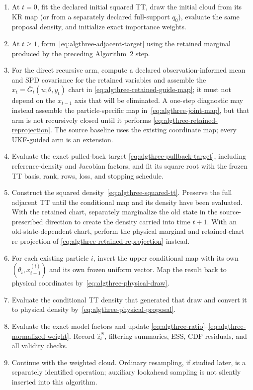 \documentclass[11pt]{article}
\begin{document}
\begin{enumerate}
\item At $t=0$, fit the declared initial squared TT, draw the initial cloud
  from its KR map (or from a separately declared full-support $q_0$), evaluate
  the same proposal density, and initialize exact importance weights.
\item At $t\geq1$, form~\eqref{eq:algthree-adjacent-target} using the retained
  marginal produced by the preceding Algorithm~2 step.
\item For the direct recursive arm, compute a declared observation-informed
  mean and SPD covariance for the retained variables and assemble the
  $x_t=\bar G_t(u;\theta,y_t)$ chart in
  \eqref{eq:algthree-retained-guide-map}; it must not depend on the
  $x_{t-1}$ axis that will be eliminated.  A one-step diagnostic may instead
  assemble the particle-specific map in~\eqref{eq:algthree-joint-map}, but that
  arm is not recursively closed until it performs
  \eqref{eq:algthree-retained-reprojection}.  The source baseline uses the
  existing coordinate map; every UKF-guided arm is an extension.
\item Evaluate the exact pulled-back target
  \eqref{eq:algthree-pullback-target}, including reference-density and
  Jacobian factors, and fit its square root with the frozen TT basis, rank,
  rows, loss, and stopping schedule.
\item Construct the squared density~\eqref{eq:algthree-squared-tt}.  Preserve
  the full adjacent TT until the conditional map and its density have been
  evaluated.  With the retained chart, separately marginalize the old state
  in the source-prescribed direction to create the density carried into time
  $t+1$.  With an old-state-dependent chart, perform the physical marginal and
  retained-chart re-projection of
  \eqref{eq:algthree-retained-reprojection} instead.
\item For each existing particle $i$, invert the upper conditional map with
  its own $(\theta_i,x_{t-1}^{(i)})$ and its own frozen uniform vector.  Map the
  result back to physical coordinates by~\eqref{eq:algthree-physical-draw}.
\item Evaluate the conditional TT density that generated that draw and convert
  it to physical density by~\eqref{eq:algthree-physical-proposal}.
\item Evaluate the exact model factors and update
  \eqref{eq:algthree-ratio}--\eqref{eq:algthree-normalized-weight}.  Record
  $\widehat z_t^N$, filtering summaries, ESS, CDF residuals, and all validity
  checks.
\item Continue with the weighted cloud.  Ordinary resampling, if studied
  later, is a separately identified operation; auxiliary lookahead sampling is
  not silently inserted into this algorithm.
\end{enumerate}
\end{document}
